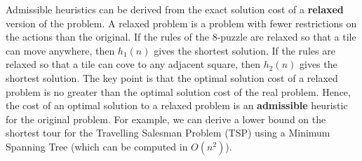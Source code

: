 Admissible heuristics can be derived from the exact solution cost of
a \textbf{relaxed} version of the problem. A relaxed problem is a problem with fewer restrictions on the actions than the original.\newline\newline
If the rules of the 8-puzzle are relaxed so that a tile can move anywhere, then $h_1(n)$ gives the shortest solution. If the rules are relaxed so that a tile can cove to any adjacent square, then $h_2(n)$ gives the shortest solution.\newline\newline
The key point is that the optimal solution cost of a relaxed problem is no greater than the optimal solution cost of the real problem. Hence, the cost of an optimal solution to a relaxed problem is an \textbf{admissible} heuristic for the original problem.\newline\newline
For example, we can derive a lower bound on the shortest tour for the Travelling Salesman Problem (TSP) using a Minimum Spanning Tree (which can be computed in $O(n^2)$).

